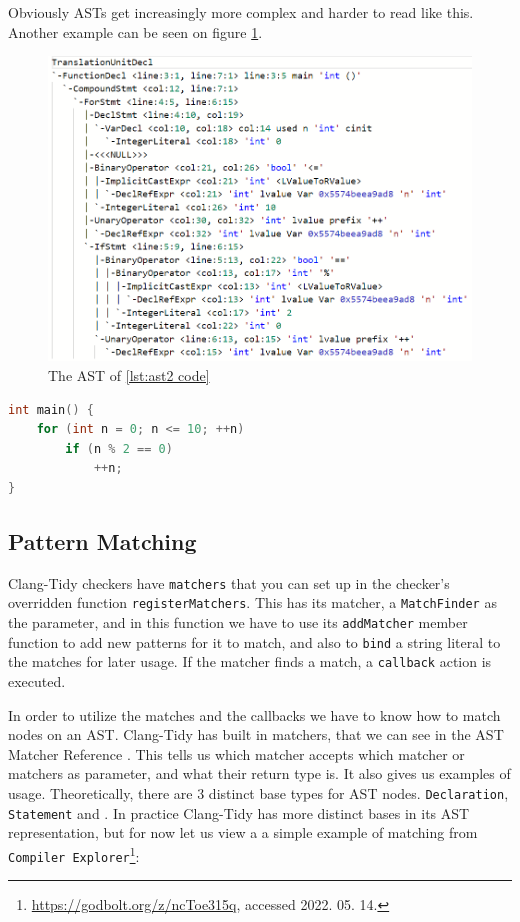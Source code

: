 Obviously ASTs get increasingly more complex and harder to read like this. Another example can be seen on figure \cref{fig:ast2}.
\begin{figure}[H]
    \includegraphics[width=\linewidth]{images/random_ast2.png}
	\caption{The AST of \cref{lst:ast2 code}}
    \label{fig:ast2}
\end{figure}

\begin{lstlisting}[language={C++},caption={The code of figure \cref{fig:ast2}.},label={lst:ast2 code}]
int main() {
	for (int n = 0; n <= 10; ++n)
		if (n % 2 == 0)
			++n;
}
\end{lstlisting}

\subsection{Pattern Matching}

Clang-Tidy checkers have \texttt{matchers} that you can set up in the checker's overridden function \texttt{registerMatchers}.
This has its matcher, a \texttt{MatchFinder} as the parameter, and in this function we have to use its \texttt{addMatcher}
member function to add new patterns for it to match, and also to \texttt{bind} a string literal to the matches for later usage.
If the matcher finds a match, a \texttt{callback} action is executed.

In order to utilize the matches and the callbacks we have to know how to match nodes on an AST. Clang-Tidy has built in matchers,
that we can see in the AST Matcher Reference \cite{matcherref}. This tells us which matcher accepts which matcher or matchers as
parameter, and what their return type is. It also gives us examples of usage.
Theoretically, there are 3 distinct base types for AST nodes. \texttt{Declaration}, \texttt{Statement} and . In practice
Clang-Tidy has more distinct bases in its AST representation, but for now let us view a a simple example of matching from
\texttt{Compiler Explorer}\footnote{\url{https://godbolt.org/z/ncToe315q}, accessed 2022. 05. 14.}: %

